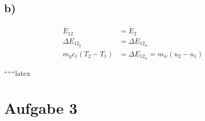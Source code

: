 

\subsection*{b)}

\begin{align*}
\dot{E}_{12} &= \dot{E}_2 \\
\Delta E_{12_g} &= \Delta E_{12_w} \\
m_g c_v (T_2 - T_1) &= \Delta E_{12_w} = m_w (u_2 - u_1)
\end{align*}

``````latex


\section*{Aufgabe 3}